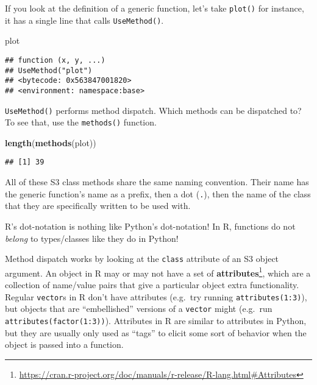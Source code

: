 \documentclass[12pt,krantz2]{krantz}
\makeatletter
\newenvironment{Shaded}{\begin{snugshade}}{\end{snugshade}}
\newcommand{\KeywordTok}[1]{\textcolor[rgb]{0.27,0.27,0.27}{\textbf{#1}}}
\newcommand{\NormalTok}[1]{#1}
\renewcommand{\href}[2]{#2\footnote{\url{#1}}}
\newenvironment{kframe}{%
\medskip{}
\setlength{\fboxsep}{.8em}
 \def\at@end@of@kframe{}%
 \ifinner\ifhmode%
  \def\at@end@of@kframe{\end{minipage}}%
  \begin{minipage}{\columnwidth}%
 \fi\fi%
 \def\FrameCommand##1{\hskip\@totalleftmargin \hskip-\fboxsep
 \colorbox{shadecolor}{##1}\hskip-\fboxsep
     \hskip-\linewidth \hskip-\@totalleftmargin \hskip\columnwidth}%
 \MakeFramed {\advance\hsize-\width
   \@totalleftmargin\z@ \linewidth\hsize
   \@setminipage}}%
 {\par\unskip\endMakeFramed%
 \at@end@of@kframe}
\renewenvironment{Shaded}{\begin{kframe}}{\end{kframe}}
\makeatother
\begin{document}
If you look at the definition of a generic function, let's take \texttt{plot()} for instance, it has a single line that calls \texttt{UseMethod()}.

\begin{Shaded}
\begin{Highlighting}[]
\NormalTok{plot}
\end{Highlighting}
\end{Shaded}

\begin{verbatim}
## function (x, y, ...) 
## UseMethod("plot")
## <bytecode: 0x563847001820>
## <environment: namespace:base>
\end{verbatim}

\texttt{UseMethod()} performs method dispatch. Which methods can be dispatched to? To see that, use the \texttt{methods()} function.

\begin{Shaded}
\begin{Highlighting}[]
\KeywordTok{length}\NormalTok{(}\KeywordTok{methods}\NormalTok{(plot))}
\end{Highlighting}
\end{Shaded}

\begin{verbatim}
## [1] 39
\end{verbatim}

All of these S3 class methods share the same naming convention. Their name has the generic function's name as a prefix, then a dot (\texttt{.}), then the name of the class that they are specifically written to be used with.

\begin{rmd-caution}
R's dot-notation is nothing like Python's dot-notation! In R, functions do not \emph{belong} to types/classes like they do in Python!

\end{rmd-caution}

Method dispatch works by looking at the \texttt{class} attribute of an S3 object argument. An object in R may or may not have a set of \href{https://cran.r-project.org/doc/manuals/r-release/R-lang.html\#Attributes}{\textbf{attributes}}, which are a collection of name/value pairs that give a particular object extra functionality. Regular \texttt{vector}s in R don't have attributes (e.g.~try running \texttt{attributes(1:3)}), but objects that are ``embellished'' versions of a \texttt{vector} might (e.g.~run \texttt{attributes(factor(1:3))}). Attributes in R are similar to attributes in Python, but they are usually only used as ``tags'' to elicit some sort of behavior when the object is passed into a function.
\end{document}
